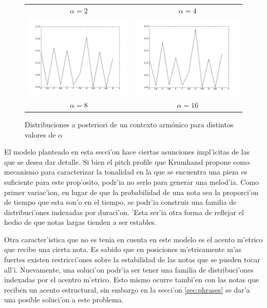 \begin{figure}[htp]
\begin{center}
\begin{tabular}{cc}
        $\alpha=2$ & $\alpha=4$ \\
        \includegraphics[width=7.5cm]{images/posteriors/posterior-profile-8.png} &
        \includegraphics[width=7.5cm]{images/posteriors/posterior-profile-16.png} \\
        $\alpha=8$ & $\alpha=16$ \\

        \end{tabular}
        \caption{Distribuciones a posteriori de un contexto arm\'onico para distintos valores de $\alpha$}
        \label{fig:pitch_posteriors}
    \end{center}      
\end{figure}

El modelo planteado en esta secci'on hace ciertas asunciones impl'icitas de las que se desea dar detalle. 
Si bien el pitch profile que Krumhansl propone como mecanismo para caracterizar la tonalidad en la que se encuentra una pieza es suficiente para este prop'osito, 
podr'ia no serlo para generar una melod'ia. Como primer variac'ion, en lugar de que la probabilidad de una nota sea la proporci'on de tiempo que esta son'o en el tiempo, 
se podr'ia construir una familia de distribuci'ones indexadas por duraci'on. 'Esta ser'ia otra forma de reflejar el hecho de que notas largas tienden a ser estables.

Otra caracter'istica que no es tenia en cuenta en este modelo es el acento m'etrico que recibe una cierta nota. Es sabido que en posiciones m'etricamente m'as fuertes
existen restricci'ones sobre la estabilidad de las notas que se pueden tocar all'i. Nuevamente, una soluci'on podr'ia ser tener una familia de distribuci'ones indexadas
por el acentro m'etrico. Esto mismo ocurre tambi'en con las notas que reciben un acento estructural, sin embargo en la secci'on \ref{sec:phrases} se dar'a una posible
soluci'on a este problema. 
